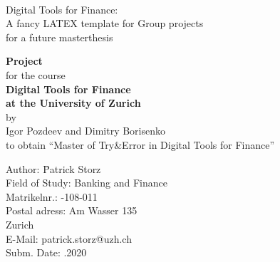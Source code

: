 \documentclass[12pt,a4paper]{article}
\begin{document}
\thispagestyle{empty}
\ \vspace{1.0cm}
\begin{center}
{\LARGE
Digital Tools for Finance: \\[0.1cm]
A fancy LATEX template for Group projects\\[0.1cm]
for a future masterthesis \\[1cm]
}

{
{\bf Project} \\
for the course \\[0.5cm]
{\bf Digital Tools for Finance } \\
{\bf at the University of Zurich} \\[0.5cm]
by\\
Igor Pozdeev and Dimitry Borisenko\\
to obtain ``Master of Try\&Error in Digital Tools for Finance'' \\[2.5cm]
}


\hspace{1cm}\begin{minipage}[h]{12cm}
\begin{tabbing}
Author: \hspace{1cm} \= Patrick Storz \\
Field of Study: \> Banking and Finance \\
Matrikelnr.: -108-011 \\
Postal adress: \> Am Wasser 135  \\
 Zurich \\
E-Mail: \> patrick.storz@uzh.ch \\
Subm. Date: .2020 \\
\end{tabbing}
\end{minipage}
\end{center}
\newpage


\begin{abstract}
Flash Eurozone PMIs for September and their signal with respect to the business cycle.
Purchasing Managers Index (PMI) is a survey that measures firms' business activity.
The surveys ask respondents (managers) to report the change in each variable (like output or employment) compared to the prior month, noting whether each has risen/improved, fallen/deteriorated or remained unchanged.Flash reading is an advanced estimate of the final PMI number based on ~85\% of total responses. It's publised about a week earlier
If PMI is 50 then nothing changed with respect to the last month. More than 50 - increased business activity. Less than 50 - decreased activity.
In addition,PMIs can be used to forecast GDP.

\end{abstract}
\newpage
\end{document}
